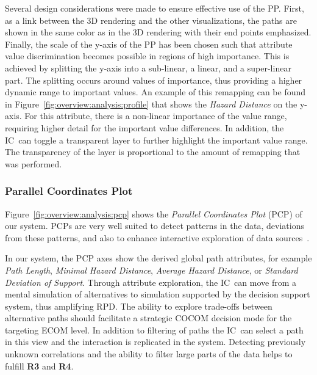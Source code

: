 \documentclass{egpubl}
\def\IC{IC}
\begin{document}
Several design considerations were made to ensure effective use of the PP. First, as a link between the 3D rendering and the other visualizations, the paths are shown in the same color as in the 3D rendering with their end points emphasized. Finally, the scale of the y-axis of the PP has been chosen such that attribute value discrimination becomes possible in regions of high importance. This is achieved by splitting the y-axis into a sub-linear, a linear, and a super-linear part. The splitting occurs around values of importance, thus providing a higher dynamic range to important values. An example of this remapping can be found in Figure~\ref{fig:overview:analysis:profile} that shows the \emph{Hazard Distance} on the y-axis. For this attribute, there is a non-linear importance of the value range, requiring higher detail for the important value differences. In addition, the \IC\ can toggle a transparent layer to further highlight the important value range. The transparency of the layer is proportional to the amount of remapping that was performed.

\subsubsection{Parallel Coordinates Plot} \label{sec:overview:analysis:pcp}
Figure~\ref{fig:overview:analysis:pcp} shows the \emph{Parallel Coordinates Plot} (PCP) of our system. PCPs are very well suited to detect  patterns in the data, deviations from these patterns, and also to enhance interactive exploration of data sources~\cite{Tory05aparallel}.

In our system, the PCP axes show the derived global path attributes, for example \emph{Path Length}, \emph{Minimal Hazard Distance}, \emph{Average Hazard Distance}, or \emph{Standard Deviation of Support}. Through attribute exploration, the \IC\ can move from a mental simulation of alternatives to simulation supported by the decision support system, thus amplifying RPD. The ability to explore trade-offs between alternative paths should facilitate a strategic COCOM decision mode for the targeting ECOM level. In addition to filtering of paths the \IC\ can select a path in this view and the interaction is replicated in the system. Detecting previously unknown correlations and the ability to filter large parts of the data helps to fulfill {\bfseries R3} and {\bfseries R4}.
\end{document}

